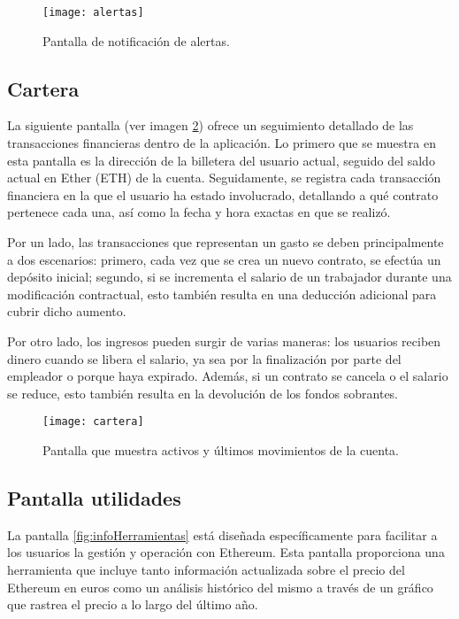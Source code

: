 \begin{figure}[h]
	\centering
	\texttt{[image: alertas]}
	\caption[Pantalla alertas]{Pantalla de notificación de alertas.}
	\label{fig:alertas}
\end{figure}



\subsection{Cartera}

La siguiente pantalla (ver imagen \ref{fig:cartera}) ofrece un seguimiento detallado de las transacciones financieras dentro de la aplicación.
Lo primero que se muestra en esta pantalla es la dirección de la billetera del usuario actual, seguido del saldo actual en Ether (ETH) de la cuenta.
Seguidamente, se registra cada transacción financiera en la que el usuario ha estado involucrado, detallando a qué contrato pertenece cada una, así como la fecha y hora exactas en que se realizó.

Por un lado, las transacciones que representan un gasto se deben principalmente a dos escenarios: primero, cada vez que se crea un nuevo contrato, se efectúa un depósito inicial; segundo, si se incrementa el salario de un trabajador durante una modificación contractual, esto también resulta en una deducción adicional para cubrir dicho aumento.

Por otro lado, los ingresos pueden surgir de varias maneras: los usuarios reciben dinero cuando se libera el salario, ya sea por la finalización por parte del empleador o porque haya expirado. Además, si un contrato se cancela o el salario se reduce, esto también resulta en la devolución de los fondos sobrantes.

\begin{figure}[h]
	\centering
	\texttt{[image: cartera]}
	\caption[Pantalla cartera]{Pantalla que muestra activos y últimos movimientos de la cuenta.}
	\label{fig:cartera}
\end{figure}



\subsection{Pantalla utilidades}

La pantalla \ref{fig:infoHerramientas} está diseñada específicamente para facilitar a los usuarios la gestión y operación con Ethereum.
Esta pantalla proporciona una herramienta que incluye tanto información actualizada sobre el precio del Ethereum en euros como un análisis histórico del mismo a través de un gráfico que rastrea el precio a lo largo del último año.

